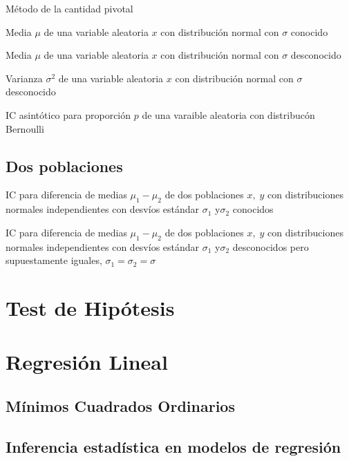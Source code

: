 \documentclass[]{article}
\begin{document}
Método de la cantidad pivotal

Media \(\mu\) de una variable aleatoria \(x\) con distribución normal
con \(\sigma\) conocido

Media \(\mu\) de una variable aleatoria \(x\) con distribución normal
con \(\sigma\) desconocido

Varianza \(\sigma^2\) de una variable aleatoria \(x\) con distribución
normal con \(\sigma\) desconocido

IC asintótico para proporción \(p\) de una varaible aleatoria con
distribucón Bernoulli

\hypertarget{dos-poblaciones}{%
\subsection{Dos poblaciones}\label{dos-poblaciones}}

IC para diferencia de medias \(\mu_1 - \mu_2\) de dos poblaciones
\(x,\; y\) con distribuciones normales independientes con desvíos
estándar \(\sigma_1\) y\(\sigma_2\) conocidos

IC para diferencia de medias \(\mu_1 - \mu_2\) de dos poblaciones
\(x,\; y\) con distribuciones normales independientes con desvíos
estándar \(\sigma_1\) y\(\sigma_2\) desconocidos pero supuestamente
iguales, \(\sigma_1 = \sigma_2 = \sigma\)

\hypertarget{test-de-hipotesis}{%
\section{Test de Hipótesis}\label{test-de-hipotesis}}

\hypertarget{regresion-lineal}{%
\section{Regresión Lineal}\label{regresion-lineal}}

\hypertarget{minimos-cuadrados-ordinarios}{%
\subsection{Mínimos Cuadrados
Ordinarios}\label{minimos-cuadrados-ordinarios}}

\hypertarget{inferencia-estadistica-en-modelos-de-regresion}{%
\subsection{Inferencia estadística en modelos de
regresión}\label{inferencia-estadistica-en-modelos-de-regresion}}
\end{document}
